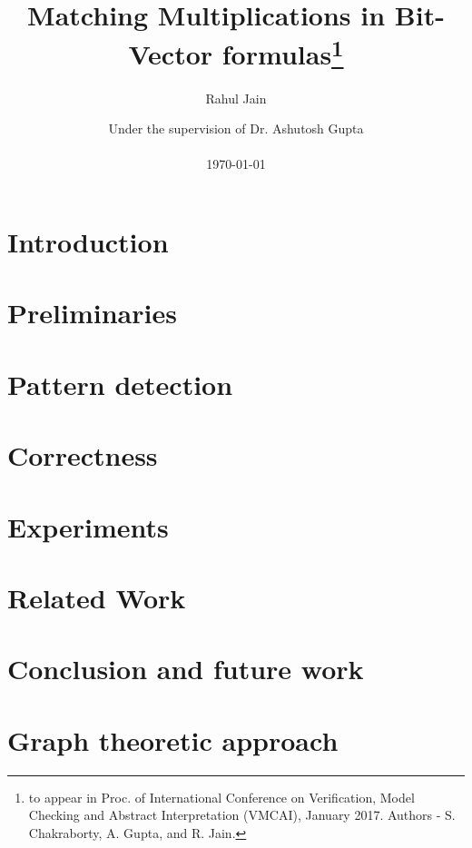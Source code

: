 \documentclass{report}
\begin{document}
\title{Matching Multiplications in Bit-Vector formulas\footnote{to appear in Proc. of International Conference on Verification, Model Checking and Abstract Interpretation (VMCAI), January 2017. Authors - S. Chakraborty, A. Gupta, and R. Jain.}}




\author{Rahul Jain}

\date{Under the supervision of Dr. Ashutosh Gupta \\ ~~\\ \today}

\maketitle

\begin{abstract}

\end{abstract}


\tableofcontents

%
\chapter{Introduction}
\label{sec:intro}


\chapter{Preliminaries}
\label{sec:prelim}


\chapter{Pattern detection}
\label{sec:pattern}


\chapter{Correctness}
\label{sec:correct}


\chapter{Experiments}
\label{sec:experiments}



 \chapter{Related Work}
 \label{sec:related}
 

\chapter{Conclusion and future work}
\label{sec:conclusion}


\chapter{Graph theoretic approach}
\label{sec:exploratory}




\end{document}
